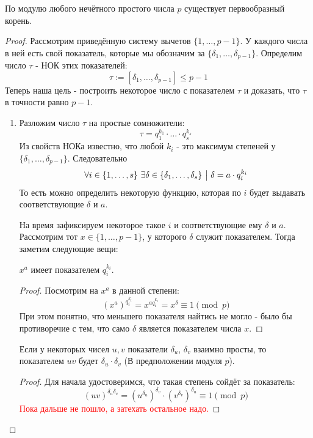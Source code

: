 \begin{theorem}
	По модулю любого нечётного простого числа $p$ существует первообразный корень.
\end{theorem}

\begin{proof}
	Рассмотрим приведённую систему вычетов $\{1, \ldots, p - 1\}$. У каждого числа в ней есть свой показатель, которые мы обозначим за $\{\delta_1, \ldots, \delta_{p - 1}\}$. Определим число $\tau$ - НОК этих показателей:
	\[
		\tau := [\delta_1, \ldots, \delta_{p - 1}] \le p - 1
	\]
	Теперь наша цель - построить некоторое число с показателем $\tau$ и доказать, что $\tau$ в точности равно $p - 1$.
	\begin{enumerate}
		\item Разложим число $\tau$ на простые сомножители:
		\[
			\tau = q_1^{k_1} \cdot \ldots \cdot q_s^{k_s}
		\]
		Из свойств НОКа известно, что любой $k_i$ - это максимум степеней у $\{\delta_1, \ldots, \delta_{p - 1}\}$. Следовательно
		\[
			\forall i \in \{1, \ldots, s\}\ \exists \delta \in \{\delta_1, \ldots, \delta_s\} \ \big|\  \delta = a \cdot q_i^{k_i}
		\]
		То есть можно определить некоторую функцию, которая по $i$ будет выдавать соответствующие $\delta$ и $a$.
		
		На время зафиксируем некоторое такое $i$ и соответствующие ему $\delta$ и $a$. Рассмотрим тот $x \in \{1,\ldots, p - 1\}$, у которого $\delta$ служит показателем. Тогда заметим следующие вещи:
		\begin{proposition}
			$x^a$ имеет показателем $q_i^{k_i}$.
		\end{proposition}
		
		\begin{proof}
			Посмотрим на $x^a$ в данной степени:
			\[
				(x^a)^{q_i^{k_i}} = x^{aq_i^{k_i}} = x^\delta \equiv 1 \pmod p
			\]
			При этом понятно, что меньшего показателя найтись не могло - было бы противоречие с тем, что само $\delta$ является показателем числа $x$.
		\end{proof}
	
		\begin{proposition}
			Если у некоторых чисел $u, v$ показатели $\delta_u$, $\delta_v$ взаимно просты, то показателем $uv$ будет $\delta_u \cdot \delta_v$ (В предположении модуля $p$).
		\end{proposition}
	
		\begin{proof}
			Для начала удостоверимся, что такая степень сойдёт за показатель:
			\[
				(uv)^{\delta_u\delta_v} = (u^{\delta_u})^{\delta_v} \cdot (v^{\delta_v})^{\delta_u} \equiv 1 \pmod p
			\]
			\textcolor{red}{Пока дальше не пошло, а затехать остальное надо.}
		\end{proof}
	

\end{enumerate}
\end{proof}
